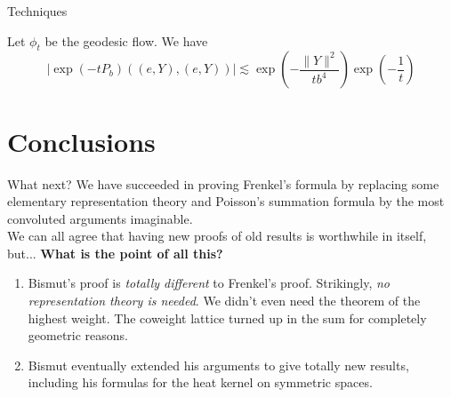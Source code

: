 \documentclass{beamer}
\numberwithin{equation}{section}
\theoremstyle{plain}
\theoremstyle{plain}
\theoremstyle{definition}
\theoremstyle{plain}
\theoremstyle{plain}
\theoremstyle{definition}
\begin{document}
\begin{frame}{Techniques}
  \begin{theorem}
    Let $\phi_t$ be the geodesic flow. We have
    \[
      |\exp(-tP_b)((e,Y),(e,Y))| \lesssim \exp(-\frac{\|Y\|^2}{tb^4})\exp(-\frac{1}{t})
    \]
  \end{theorem}
\end{frame}


\section{Conclusions}

\begin{frame}{What next?}
  We have succeeded in proving Frenkel's formula by replacing some elementary representation theory and Poisson's summation formula by the most convoluted arguments imaginable. \\
  
  We can all agree that having new proofs of old results is worthwhile in itself, but...
  \textbf{What is the point of all this?}
  \begin{enumerate}
    \item{} Bismut's proof is \emph{totally different} to Frenkel's proof. Strikingly, \emph{no representation theory is needed}. We didn't even need the theorem of the highest weight. The coweight lattice turned up in the sum for completely geometric reasons.
    \item{} Bismut eventually extended his arguments to give totally new results, including his formulas for the heat kernel on symmetric spaces.
  \end{enumerate}
\end{frame}


\begin{frame}
\end{frame}
\end{document}
